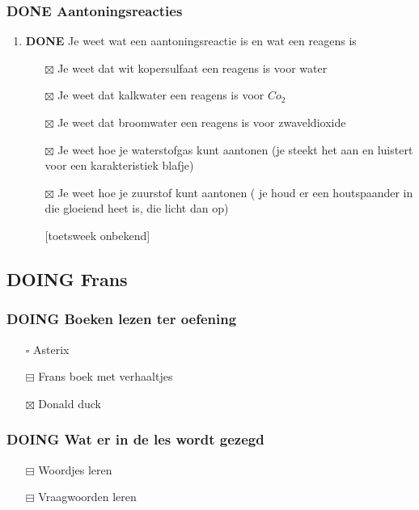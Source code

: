 \documentclass[11pt]{article}
\begin{document}
\subsubsection{{\bfseries\sffamily DONE} Aantoningsreacties}
\label{sec:org8191ce3}
\begin{enumerate}
\item {\bfseries\sffamily DONE} Je weet wat een aantoningsreactie is en wat een reagens is
\label{sec:org624819d}
\begin{itemize}
\item[{$\boxtimes$}] Je weet dat wit kopersulfaat een reagens is voor water
\item[{$\boxtimes$}] Je weet dat kalkwater een reagens is voor \(Co_2\)
\item[{$\boxtimes$}] Je weet dat broomwater een reagens is voor zwaveldioxide
\item[{$\boxtimes$}] Je weet hoe je waterstofgas kunt aantonen (je steekt het aan en luistert voor een karakteristiek blafje)
\item[{$\boxtimes$}] Je weet hoe je zuurstof kunt aantonen ( je houd er een houtspaander in die gloeiend heet is, die licht dan op)

[toetsweek onbekend]
\end{itemize}
\end{enumerate}
\subsection{{\bfseries\sffamily DOING} Frans}
\label{sec:orgb9bfe77}
\subsubsection{{\bfseries\sffamily DOING} Boeken lezen ter oefening}
\label{sec:org36d08d0}
\begin{itemize}
\item[{$\square$}] Asterix
\item[{$\boxminus$}] Frans boek met verhaaltjes
\item[{$\boxtimes$}] Donald duck
\end{itemize}
\subsubsection{{\bfseries\sffamily DOING} Wat er in de les wordt gezegd}
\label{sec:orgc8f7ebc}
\begin{itemize}
\item[{$\boxminus$}] Woordjes leren
\item[{$\boxminus$}] Vraagwoorden leren
\end{itemize}
\end{document}
